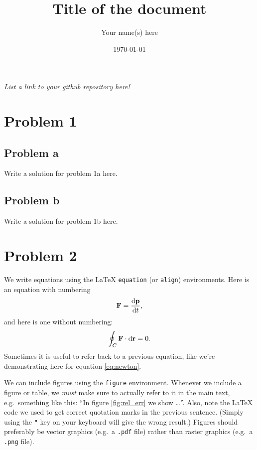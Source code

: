 \documentclass[english,notitlepage]{revtex4-1}  %
\begin{document}
	
	\title{Title of the document}      %
	\author{Your name(s) here}          %
	\date{\today}                             %
	\noaffiliation                            %
	
	
	\maketitle 
	
	\textit{List a link to your github repository here!}
	
	\section*{Problem 1}
	
	\subsection*{Problem a}
	Write a solution for problem 1a here.
	
	\subsection*{Problem b}
	Write a solution for problem 1b here.
	
	\section*{Problem 2}
	We write equations using the LaTeX \texttt{equation} (or \texttt{align}) environments. Here is an equation with numbering
	\begin{equation}\label{eq:newton}
		\vb{F} = \dv{\vb{p}}{t},
	\end{equation}
	and here is one without numbering:
	\begin{equation*}
		\oint_C \vb{F}\cdot \dd \vb{r} = 0.
	\end{equation*}
	Sometimes it is useful to refer back to a previous equation, like we're demonstrating here for equation \ref{eq:newton}.
	
	We can include figures using the \texttt{figure} environment. Whenever we include a figure or table, we \textit{must} make sure to actually refer to it in the main text, e.g.\ something like this: ``In figure \ref{fig:rel_err} we show \ldots''. 
	Also, note the LaTeX code we used to get correct quotation marks in the previous sentence. (Simply using the \texttt{"} key on your keyboard will give the wrong result.) Figures should preferably be vector graphics (e.g.\ a \texttt{.pdf} file) rather than raster graphics (e.g.\ a \texttt{.png} file).
	
\end{document}
